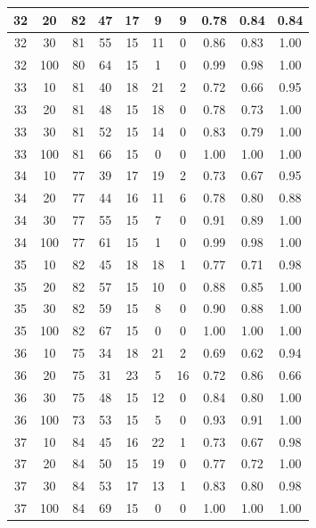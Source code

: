 \begin{longtable}{ |c|c|c|c|c|c|c|c|c|c| }
            32 & 20 & 82 & 47 & 17 & 9 & 9 & 0.78 & 0.84 & 0.84 \\ \hline
            32 & 30 & 81 & 55 & 15 & 11 & 0 & 0.86 & 0.83 & 1.00 \\ \hline
            32 & 100 & 80 & 64 & 15 & 1 & 0 & 0.99 & 0.98 & 1.00 \\ \hline
            33 & 10 & 81 & 40 & 18 & 21 & 2 & 0.72 & 0.66 & 0.95 \\ \hline
            33 & 20 & 81 & 48 & 15 & 18 & 0 & 0.78 & 0.73 & 1.00 \\ \hline
            33 & 30 & 81 & 52 & 15 & 14 & 0 & 0.83 & 0.79 & 1.00 \\ \hline
            33 & 100 & 81 & 66 & 15 & 0 & 0 & 1.00 & 1.00 & 1.00 \\ \hline
            34 & 10 & 77 & 39 & 17 & 19 & 2 & 0.73 & 0.67 & 0.95 \\ \hline
            34 & 20 & 77 & 44 & 16 & 11 & 6 & 0.78 & 0.80 & 0.88 \\ \hline
            34 & 30 & 77 & 55 & 15 & 7 & 0 & 0.91 & 0.89 & 1.00 \\ \hline
            34 & 100 & 77 & 61 & 15 & 1 & 0 & 0.99 & 0.98 & 1.00 \\ \hline
            35 & 10 & 82 & 45 & 18 & 18 & 1 & 0.77 & 0.71 & 0.98 \\ \hline
            35 & 20 & 82 & 57 & 15 & 10 & 0 & 0.88 & 0.85 & 1.00 \\ \hline
            35 & 30 & 82 & 59 & 15 & 8 & 0 & 0.90 & 0.88 & 1.00 \\ \hline
            35 & 100 & 82 & 67 & 15 & 0 & 0 & 1.00 & 1.00 & 1.00 \\ \hline
            36 & 10 & 75 & 34 & 18 & 21 & 2 & 0.69 & 0.62 & 0.94 \\ \hline
            36 & 20 & 75 & 31 & 23 & 5 & 16 & 0.72 & 0.86 & 0.66 \\ \hline
            36 & 30 & 75 & 48 & 15 & 12 & 0 & 0.84 & 0.80 & 1.00 \\ \hline
            36 & 100 & 73 & 53 & 15 & 5 & 0 & 0.93 & 0.91 & 1.00 \\ \hline
            37 & 10 & 84 & 45 & 16 & 22 & 1 & 0.73 & 0.67 & 0.98 \\ \hline
            37 & 20 & 84 & 50 & 15 & 19 & 0 & 0.77 & 0.72 & 1.00 \\ \hline
            37 & 30 & 84 & 53 & 17 & 13 & 1 & 0.83 & 0.80 & 0.98 \\ \hline
            37 & 100 & 84 & 69 & 15 & 0 & 0 & 1.00 & 1.00 & 1.00 \\ \hline

\end{longtable}
